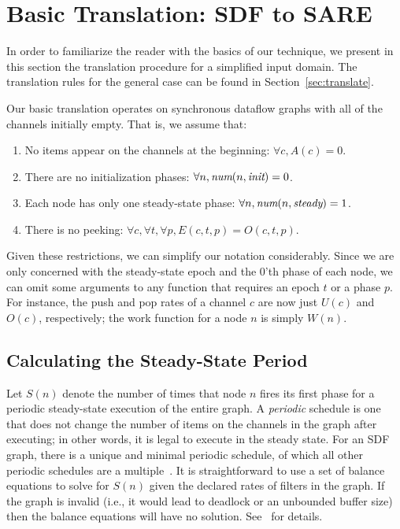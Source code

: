 \section{Basic Translation: SDF to SARE}
\label{sec:simple}

In order to familiarize the reader with the basics of our technique,
we present in this section the translation procedure for a simplified
input domain.  The translation rules for the general case can be found
in Section~\ref{sec:translate}.

Our basic translation operates on synchronous dataflow graphs with all
of the channels initially empty.  That is, we assume that:
\begin{enumerate}

\item No items appear on the channels at the beginning:  $\forall c, A(c) = 0$.

\item There are no initialization phases: $\forall n, \mbox{\it num}(n, \mbox{\it init}) = 0$.

\item Each node has only one steady-state phase: $\forall n, \mbox{\it num}(n, \mbox{\it steady}) = 1$.

\item There is no peeking: $\forall c, \forall t, \forall p, E(c, t, p) = O(c, t, p)$.

\end{enumerate}

Given these restrictions, we can simplify our notation considerably.
Since we are only concerned with the steady-state epoch and the 0'th
phase of each node, we can omit some arguments to any function that
requires an epoch $t$ or a phase $p$.  For instance, the push and pop
rates of a channel $c$ are now just $U(c)$ and $O(c)$, respectively;
the work function for a node $n$ is simply $W(n)$.

\subsection{Calculating the Steady-State Period}
\label{sec:balance}

Let $S(n)$ denote the number of times that node $n$ fires its first
phase for a periodic steady-state execution of the entire graph. A
{\it periodic} schedule is one that does not change the number of
items on the channels in the graph after executing; in other words, it
is legal to execute in the steady state.  For an SDF graph, there is a
unique and minimal periodic schedule, of which all other periodic
schedules are a multiple~\cite{leesdf}.  It is straightforward to use
a set of balance equations to solve for $S(n)$ given the declared
rates of filters in the graph.  If the graph is invalid (i.e., it
would lead to deadlock or an unbounded buffer size) then the balance
equations will have no solution.  See~\cite{leesdf} for details.


